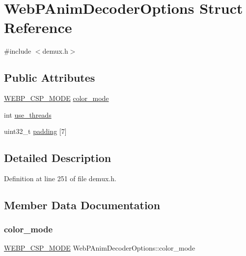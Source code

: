 \hypertarget{struct_web_p_anim_decoder_options}{}\section{Web\+P\+Anim\+Decoder\+Options Struct Reference}
\label{struct_web_p_anim_decoder_options}


{\ttfamily \#include $<$demux.\+h$>$}

\subsection*{Public Attributes}
\begin{DoxyCompactItemize}
\item 
\mbox{\hyperlink{decode_8h_aa2b2301594d9da5ecc3e8890ac023e79}{W\+E\+B\+P\+\_\+\+C\+S\+P\+\_\+\+M\+O\+DE}} \mbox{\hyperlink{struct_web_p_anim_decoder_options_ac17fb38c270999bda7e64663ae31a77e}{color\+\_\+mode}}
\item 
int \mbox{\hyperlink{struct_web_p_anim_decoder_options_ab4673c46c0607142f5e736c38ecd17fe}{use\+\_\+threads}}
\item 
uint32\+\_\+t \mbox{\hyperlink{struct_web_p_anim_decoder_options_aba7c45d13c4af36fd288db52fd7fa8f4}{padding}} \mbox{[}7\mbox{]}
\end{DoxyCompactItemize}


\subsection{Detailed Description}


Definition at line 251 of file demux.\+h.



\subsection{Member Data Documentation}
\mbox{\label{struct_web_p_anim_decoder_options_ac17fb38c270999bda7e64663ae31a77e}} 
\subsubsection{\texorpdfstring{color\_mode}{color\_mode}}
{\footnotesize\ttfamily \mbox{\hyperlink{decode_8h_aa2b2301594d9da5ecc3e8890ac023e79}{W\+E\+B\+P\+\_\+\+C\+S\+P\+\_\+\+M\+O\+DE}} Web\+P\+Anim\+Decoder\+Options\+::color\+\_\+mode}




